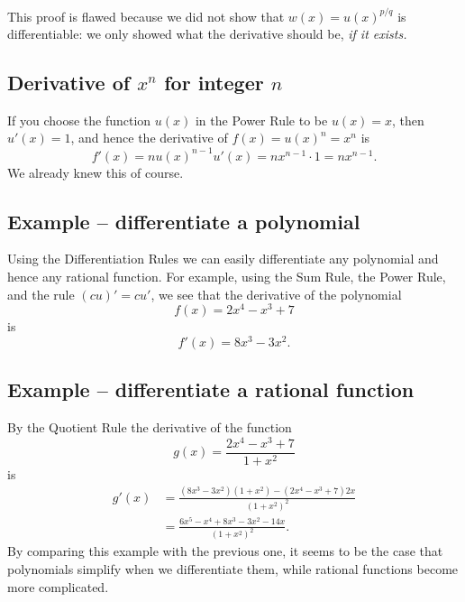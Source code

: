 This proof is flawed because we did not show that $w(x) = u(x)^{p/q}$ is
differentiable:  we only showed what the derivative should be,
\textit{if it exists. }
















\subsection{Derivative of $x^n$ for integer $n$} 
If you choose the function $u(x)$ in the Power Rule to be $u(x) = x$, then
$u'(x) = 1$, and hence the derivative of $f(x) = u(x)^n = x^n$ is
\[
f'(x)
= nu(x)^{n-1} u'(x)
= nx^{n-1}\cdot 1
= nx^{n-1}.
\]
We already knew this of course.












\subsection{Example -- differentiate a polynomial} 
Using the Differentiation Rules we can easily differentiate any polynomial and
hence any rational function.  For example, using the Sum Rule, the Power Rule,
and the rule $(cu)'=cu'$, we see that the derivative of the polynomial
\[
f(x)= 2x^4-x^3+7
\]
is
\[
f'(x)=8x^3-3x^2.
\]




\subsection{Example -- differentiate a rational function} 
By the Quotient Rule the derivative of the function
\[
g(x)=\frac{2x^4-x^3+7}{1+x^2}
\]
is
\begin{align*}
  g'(x)&=\frac{(8x^3-3x^2)(1+x^2)-(2x^4-x^3+7)2x}{(1+x^2)^2}\\
  &=\frac{6x^5-x^4+8x^3-3x^2-14x}{(1+x^2)^2}.
\end{align*}
By comparing this example with the previous one, it seems to be the case that
polynomials simplify when we differentiate them, while rational
functions become more complicated.




